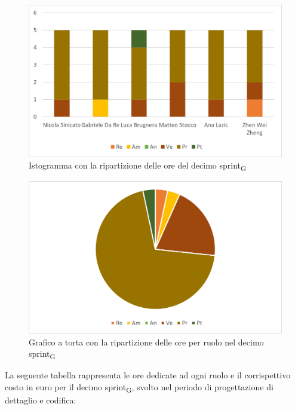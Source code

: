 \begin{figure}[H]
	\centering
	\includegraphics[scale=0.6]{img/grafi preventivo/istogrammi/codifica/sprint10.png}
	\caption{Istogramma con la ripartizione delle ore del decimo sprint\textsubscript{G}}
\end{figure}
\begin{figure}[H]
	\centering
	\includegraphics[scale=0.6]{img/grafi preventivo/torta/codifica/sprint10.png}
	\caption{Grafico a torta con la ripartizione delle ore per ruolo nel decimo sprint\textsubscript{G}}
\end{figure}
La seguente tabella rappresenta le ore dedicate ad ogni ruolo e il corrispettivo costo in euro per il decimo sprint\textsubscript{G}, svolto nel periodo di progettazione di dettaglio e codifica: 

